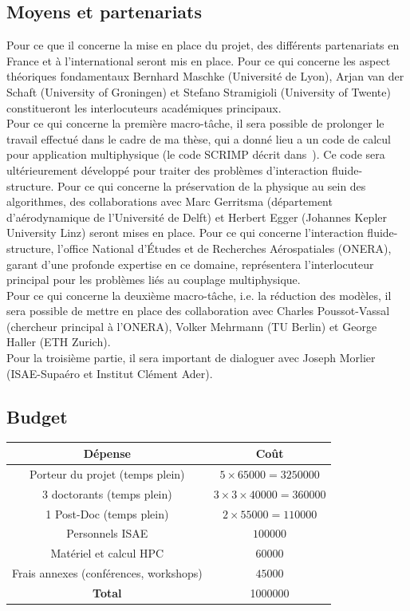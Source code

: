 \documentclass[french]{article}
\begin{document}
\subsection{Moyens et partenariats}
Pour ce que il concerne la mise en place du projet, des différents partenariats en France et \`a l'international seront mis en place. Pour ce qui concerne les aspect théoriques fondamentaux Bernhard Maschke (Universit\'e de Lyon), Arjan van der Schaft (University of Groningen) et Stefano Stramigioli (University of Twente) constitueront les interlocuteurs académiques principaux. \\

Pour ce qui concerne la première macro-tâche, il sera possible de prolonger le travail effectué dans le cadre de ma thèse, qui a donn\'e lieu a un code de calcul pour application multiphysique (le code SCRIMP décrit dans~\cite{brugnoli2021num}). Ce code sera ultérieurement développé pour traiter des problèmes d'interaction fluide-structure. Pour ce qui concerne la préservation de la physique au sein des algorithmes, des collaborations avec Marc Gerritsma (département d'aérodynamique de l'Universit\'e de Delft) et Herbert Egger (Johannes Kepler University Linz) seront mises en place. Pour ce qui concerne l'interaction fluide-structure, l'office National d'Études et de Recherches Aérospatiales (ONERA), garant d'une profonde expertise en ce domaine, représentera l'interlocuteur principal pour les problèmes liés au couplage multiphysique. 
\\


Pour ce qui concerne la deuxième macro-tâche, i.e. la réduction des modèles, il sera possible de mettre en place des collaboration avec Charles Poussot-Vassal (chercheur principal \`a l'ONERA),  Volker Mehrmann (TU Berlin) et George Haller (ETH Zurich). \\

Pour la troisième partie, il sera important de dialoguer avec Joseph Morlier (ISAE-Supa\'ero et Institut Clément Ader).


\subsection{Budget}
\begin{center}
\begin{tabular}{|c|c|}
	\hline
	D\'epense & Co\^{u}t \\
	\hline
	Porteur du projet (temps plein) & $5\times 65000=3250000$ \\
	3 doctorants (temps plein) & $3\times 3\times 40000=360000$  \\
	1 Post-Doc (temps plein) & $2\times 55000=110000$ \\
	Personnels ISAE & $100000$ \\
	Matériel  et calcul HPC & $60000$ \\
	Frais annexes (conférences, workshops) & $45000$ \\
	\hline
	\textbf{Total} & 1000000 \\
	\hline
\end{tabular}
\end{center}



\footnotesize


\end{document}
